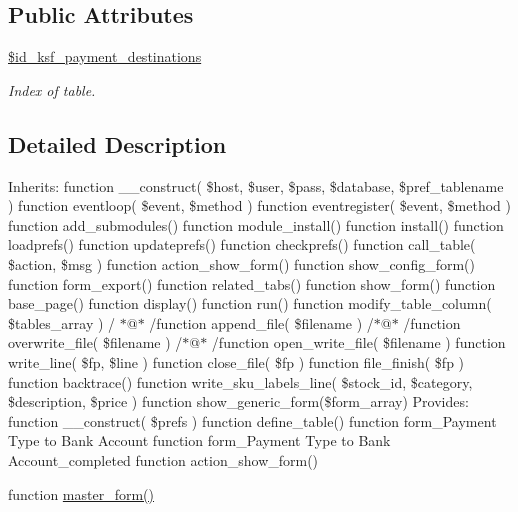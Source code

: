 \subsection*{Public Attributes}
\begin{DoxyCompactItemize}
\item 
\hypertarget{classksf__payment__destinations__view_a94f35a0a472729499647d7860c9d9798}{}\label{classksf__payment__destinations__view_a94f35a0a472729499647d7860c9d9798} 
\hyperlink{classksf__payment__destinations__view_a94f35a0a472729499647d7860c9d9798}{\$id\+\_\+ksf\+\_\+payment\+\_\+destinations}
\begin{DoxyCompactList}\small\item\em Index of table. \end{DoxyCompactList}\end{DoxyCompactItemize}


\subsection{Detailed Description}
Inherits\+: function \+\_\+\+\_\+construct( \$host, \$user, \$pass, \$database, \$pref\+\_\+tablename ) function eventloop( \$event, \$method ) function eventregister( \$event, \$method ) function add\+\_\+submodules() function module\+\_\+install() function install() function loadprefs() function updateprefs() function checkprefs() function call\+\_\+table( \$action, \$msg ) function action\+\_\+show\+\_\+form() function show\+\_\+config\+\_\+form() function form\+\_\+export() function related\+\_\+tabs() function show\+\_\+form() function base\+\_\+page() function display() function run() function modify\+\_\+table\+\_\+column( \$tables\+\_\+array ) / $\ast$@$\ast$ /function append\+\_\+file( \$filename ) /$\ast$@$\ast$ /function overwrite\+\_\+file( \$filename ) /$\ast$@$\ast$ /function open\+\_\+write\+\_\+file( \$filename ) function write\+\_\+line( \$fp, \$line ) function close\+\_\+file( \$fp ) function file\+\_\+finish( \$fp ) function backtrace() function write\+\_\+sku\+\_\+labels\+\_\+line( \$stock\+\_\+id, \$category, \$description, \$price ) function show\+\_\+generic\+\_\+form(\$form\+\_\+array) Provides\+: function \+\_\+\+\_\+construct( \$prefs ) function define\+\_\+table() function form\+\_\+\+Payment Type to Bank Account function form\+\_\+\+Payment Type to Bank Account\+\_\+completed function action\+\_\+show\+\_\+form()

function \hyperlink{classksf__payment__destinations__view_a803d4b744228624d16222728b9062f74}{master\+\_\+form()} 

